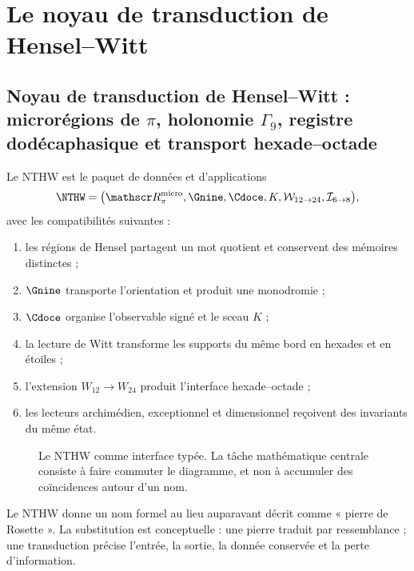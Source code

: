 \label{chap:83-12}

\section{Le noyau de transduction de Hensel--Witt}
\label{p12-83-c12-s1:chap:nthw}


\subsection{Noyau de transduction de Hensel–Witt : microrégions de \(\pi\), holonomie \(\Gamma_9\), registre dodécaphasique et transport hexade–octade}

Le NTHW est le paquet de données et d’applications
\[
\NTHW=
\bigl(
\mathscr R_\pi^{\rm micro},
\Gnine,
\Cdoce,
K,
\mathcal W_{12\to24},
\mathcal I_{6\to8}
\bigr),
\]
avec les compatibilités suivantes :
\begin{enumerate}
  \item les régions de Hensel partagent un mot quotient et conservent
  des mémoires distinctes ;
  \item \(\Gnine\) transporte l’orientation et produit une monodromie ;
  \item \(\Cdoce\) organise l’observable signé et le sceau \(K\) ;
  \item la lecture de Witt transforme les supports du même bord en hexades et en
  étoiles ;
  \item l’extension \(W_{12}\to W_{24}\) produit l’interface
  hexade--octade ;
  \item les lecteurs archimédien, exceptionnel et dimensionnel reçoivent
  des invariants du même état.
\end{enumerate}

\begin{figure}[p]
\centering
\resizebox{\textwidth}{!}{}
\caption{Le NTHW comme interface typée. La tâche mathématique centrale consiste à faire
commuter le diagramme, et non à accumuler des coïncidences autour d’un nom.}
\label{p12-83-c12-s1:fig:nthw}
\end{figure}

Le NTHW donne un nom formel au lieu auparavant décrit comme « pierre de
Rosette ». La substitution est conceptuelle : une pierre traduit par ressemblance ; une
transduction précise l’entrée, la sortie, la donnée conservée et la perte
d’information.

